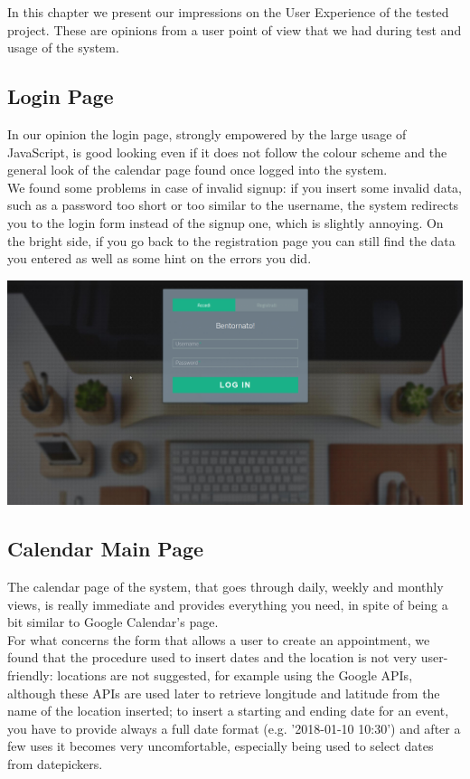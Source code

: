 In this chapter we present our impressions on the User Experience of the tested project. These are opinions from a user point of view that we had during test and usage of the system.

\subsection{Login Page}

In our opinion the login page, strongly empowered by the large usage of JavaScript, is good looking even if it does not follow the colour scheme and the general look of the calendar page found once logged into the system. \\
We found some problems in case of invalid signup: if you insert some invalid data, such as a password too short or too similar to the username, the system redirects you to the login form instead of the signup one, which is slightly annoying. On the bright side, if you go back to the registration page you can still find the data you entered as well as some hint on the errors you did.

\begin{center}
\includegraphics[width=\textwidth]{Images/LoginPage}
\end{center}

\subsection{Calendar Main Page}

The calendar page of the system, that goes through daily, weekly and monthly views, is really immediate and provides everything you need, in spite of being a bit similar to Google Calendar's page. \\
For what concerns the form that allows a user to create an appointment, we found that the procedure used to insert dates and the location is not very user-friendly: locations are not suggested, for example using the Google APIs, although these APIs are used later to retrieve longitude and latitude from the name of the location inserted; to insert a starting and ending date for an event, you have to provide always a full date format (e.g. '2018-01-10 10:30') and after a few uses it becomes very uncomfortable, especially being used to select dates from datepickers.

